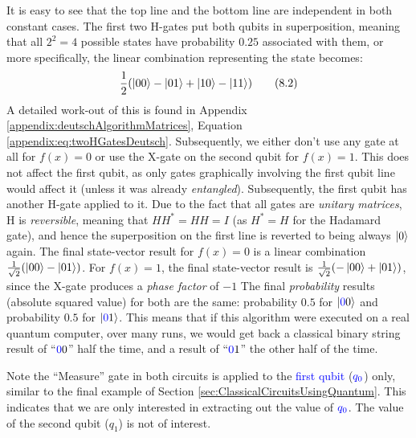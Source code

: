 \documentclass[conference]{IEEEtran}
\begin{document}
It is easy to see that the top line and the bottom line are independent in both constant cases.
The first two H-gates put both qubits in superposition, meaning that all $2^2=4$ possible states have
probability $0.25$ associated with them, or more specifically, the linear combination representing the state becomes:
\begin{equation}
    \frac{1}{2}(\ket{00} - \ket{01} + \ket{10} - \ket{11}) \tag{8.2} \label{eq:deutschSuperpositionInitial}
\end{equation}
A detailed work-out of this is found in Appendix \ref{appendix:deutschAlgorithmMatrices}, Equation \ref{appendix:eq:twoHGatesDeutsch}.
Subsequently, we either don't use any gate at all for $f(x)=0$ or use the X-gate on the second qubit for $f(x)=1$.
This does not affect the first qubit, as only gates graphically involving the first qubit line would
affect it (unless it was already \textit{entangled}).
Subsequently, the first qubit has another H-gate applied to it. Due to the fact that all gates are \textit{unitary matrices},
H is \textit{reversible}, meaning that
$HH^*=HH=I$ (as $H^*=H$ for the Hadamard gate),
and hence the superposition on the first line is reverted to being always $\ket{0}$ again.
The final state-vector result for $f(x)=0$ is a linear combination $\frac{1}{\sqrt{2}}(\ket{00} - \ket{01})$.
For $f(x)=1$, the final state-vector result is $\frac{1}{\sqrt{2}}(-\ket{00} + \ket{01})$,
since the X-gate produces a \textit{phase factor} of $-1$
The final \textit{probability} results (absolute squared value) for both are the same:
probability $0.5$ for $\ket{\textcolor{blue}{0}0}$ and probability $0.5$ for $\ket{\textcolor{blue}{0}1}$.
This means that if this algorithm were executed on a real quantum computer, over many runs,
we would get back a classical binary string result of ``$\textcolor{blue}{0}0$'' half the time,
and a result of ``$\textcolor{blue}{0}1$'' the other half of the time.

Note the ``Measure'' gate in both circuits is applied to the \textcolor{blue}{first qubit} ($\textcolor{blue}{q_0}$) only,
similar to the final example of Section \ref{sec:ClassicalCircuitsUsingQuantum}.
This indicates that we are only interested in extracting out the value of $\textcolor{blue}{q_0}$. The value of the second qubit ($q_1$) is not of interest.
\end{document}
